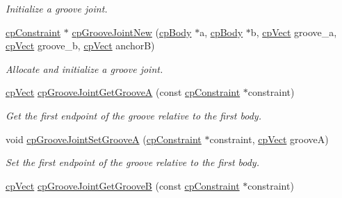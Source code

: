 \begin{DoxyCompactItemize}
\begin{DoxyCompactList}\small\item\em Initialize a groove joint. \end{DoxyCompactList}\item 
\hypertarget{group__cp_groove_joint_ga53011996f518e338c51c1f9bf9f8d674}{}\hyperlink{structcp_constraint}{cp\+Constraint} $\ast$ \hyperlink{group__cp_groove_joint_ga53011996f518e338c51c1f9bf9f8d674}{cp\+Groove\+Joint\+New} (\hyperlink{structcp_body}{cp\+Body} $\ast$a, \hyperlink{structcp_body}{cp\+Body} $\ast$b, \hyperlink{structcp_vect}{cp\+Vect} groove\+\_\+a, \hyperlink{structcp_vect}{cp\+Vect} groove\+\_\+b, \hyperlink{structcp_vect}{cp\+Vect} anchor\+B)\label{group__cp_groove_joint_ga53011996f518e338c51c1f9bf9f8d674}

\begin{DoxyCompactList}\small\item\em Allocate and initialize a groove joint. \end{DoxyCompactList}\item 
\hypertarget{group__cp_groove_joint_ga42475ce8a3b9b62ba66bf99a1f4a9575}{}\hyperlink{structcp_vect}{cp\+Vect} \hyperlink{group__cp_groove_joint_ga42475ce8a3b9b62ba66bf99a1f4a9575}{cp\+Groove\+Joint\+Get\+Groove\+A} (const \hyperlink{structcp_constraint}{cp\+Constraint} $\ast$constraint)\label{group__cp_groove_joint_ga42475ce8a3b9b62ba66bf99a1f4a9575}

\begin{DoxyCompactList}\small\item\em Get the first endpoint of the groove relative to the first body. \end{DoxyCompactList}\item 
\hypertarget{group__cp_groove_joint_ga910111a5d88d7259812c283838195588}{}void \hyperlink{group__cp_groove_joint_ga910111a5d88d7259812c283838195588}{cp\+Groove\+Joint\+Set\+Groove\+A} (\hyperlink{structcp_constraint}{cp\+Constraint} $\ast$constraint, \hyperlink{structcp_vect}{cp\+Vect} groove\+A)\label{group__cp_groove_joint_ga910111a5d88d7259812c283838195588}

\begin{DoxyCompactList}\small\item\em Set the first endpoint of the groove relative to the first body. \end{DoxyCompactList}\item 
\hypertarget{group__cp_groove_joint_ga1f497e2dbd015144d4e22a249129b6f2}{}\hyperlink{structcp_vect}{cp\+Vect} \hyperlink{group__cp_groove_joint_ga1f497e2dbd015144d4e22a249129b6f2}{cp\+Groove\+Joint\+Get\+Groove\+B} (const \hyperlink{structcp_constraint}{cp\+Constraint} $\ast$constraint)\label{group__cp_groove_joint_ga1f497e2dbd015144d4e22a249129b6f2}


\end{DoxyCompactItemize}
